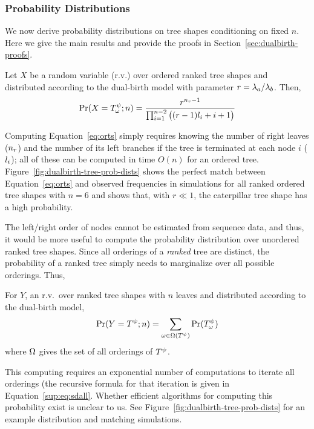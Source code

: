 \subsubsection{Probability Distributions}
We now derive probability distributions on tree shapes conditioning on fixed $n$. Here we give the main results and provide the proofs in Section~\ref{sec:dualbirth-proofs}.

\begin{theorem}\label{thm:TRO}
Let $X$ be a random variable (r.v.) over ordered ranked tree shapes and distributed according to the dual-birth model with parameter $r=\lambda_a/\lambda_b$. Then, 
\begin{equation}\label{eq:orts}
\Pr(X=T^\psi_{\omega};n) = \frac{r^{n_r-1}}{\prod_{i=1}^{n-2} \big((r-1)l_{i}+i+1\big)}
\end{equation}
\end{theorem}

Computing Equation~\ref{eq:orts} simply requires knowing the number of right leaves ($n_r$) and the number of its left branches if the tree is terminated at each node $i$ ($l_{i}$); all of these can be computed in time $O(n)$ for an ordered tree. Figure~\ref{fig:dualbirth-tree-prob-dists} shows the perfect match between Equation~\ref{eq:orts} and observed frequencies in simulations for all ranked ordered tree shapes with $n=6$ and shows that, with $r\ll1$, the caterpillar tree shape has a high probability.

The left/right order of nodes cannot be estimated from sequence data, and thus, it would be more useful to compute the probability distribution over unordered ranked tree shapes. Since all orderings of a \textit{ranked} tree are distinct, the probability of a ranked tree simply needs to marginalize over all possible orderings. Thus,
\begin{corollary}
For $Y$, an r.v.\ over ranked tree shapes with $n$ leaves and distributed according to the dual-birth model,
\begin{equation}\label{eq:rts}
\Pr(Y=T^\psi;n) = \sum_{\omega\in\Omega(T^\psi)} \Pr(T^\psi_{\omega})
\end{equation}
where $\Omega$ gives the set of all orderings of $T^\psi$.
\end{corollary}

This computing requires an exponential number of computations to iterate all orderings (the recursive formula for that iteration is given in Equation~\ref{sup:eq:sdall}. Whether efficient algorithms for computing this probability exist is unclear to us. See Figure~\ref{fig:dualbirth-tree-prob-dists} for an example distribution and matching simulations.

